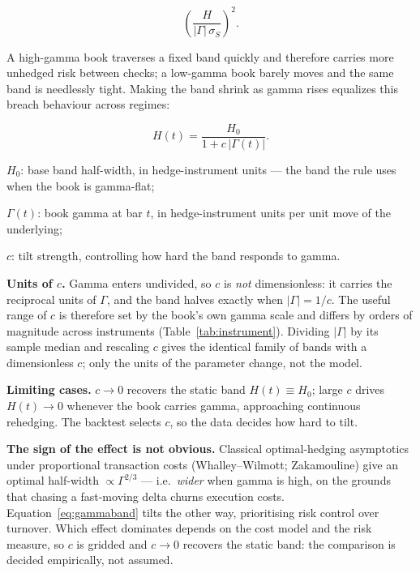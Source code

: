 \documentclass{article}
\begin{document}
\[
\left( \frac{H}{\lvert\Gamma\rvert\,\sigma_S} \right)^{2}.
\]

A high-gamma book traverses a fixed band quickly and therefore carries more unhedged risk
between checks; a low-gamma book barely moves and the same band is needlessly tight.
Making the band shrink as gamma rises equalizes this breach behaviour across regimes:

\begin{eqbox}
\begin{equation}
H(t) = \frac{H_0}{1 + c\,\lvert \Gamma(t) \rvert}.
\label{eq:gammaband}
\end{equation}
\end{eqbox}

\begin{vardefs}
\item $H_0$: base band half-width, in hedge-instrument units --- the band the rule uses
  when the book is gamma-flat;
\item $\Gamma(t)$: book gamma at bar $t$, in hedge-instrument units per unit move of the
  underlying;
\item $c$: tilt strength, controlling how hard the band responds to gamma.
\end{vardefs}

\textbf{Units of $c$.} Gamma enters undivided, so $c$ is \emph{not} dimensionless: it
carries the reciprocal units of $\Gamma$, and the band halves exactly when
$\lvert\Gamma\rvert = 1/c$. The useful range of $c$ is therefore set by the book's own
gamma scale and differs by orders of magnitude across instruments
(Table~\ref{tab:instrument}). Dividing $\lvert\Gamma\rvert$ by its sample median and
rescaling $c$ gives the identical family of bands with a dimensionless $c$; only the
units of the parameter change, not the model.

\textbf{Limiting cases.} $c \to 0$ recovers the static band $H(t) \equiv H_0$; large $c$
drives $H(t) \to 0$ whenever the book carries gamma, approaching continuous rehedging.
The backtest selects $c$, so the data decides how hard to tilt.

\begin{whybox}
\textbf{The sign of the effect is not obvious.} Classical optimal-hedging asymptotics
under proportional transaction costs (Whalley--Wilmott; Zakamouline) give an optimal
half-width $\propto \Gamma^{2/3}$ --- i.e.\ \emph{wider} when gamma is high, on the
grounds that chasing a fast-moving delta churns execution costs. Equation~\eqref{eq:gammaband}
tilts the other way, prioritising risk control over turnover. Which effect dominates
depends on the cost model and the risk measure, so $c$ is gridded and $c \to 0$ recovers
the static band: the comparison is decided empirically, not assumed.
\end{whybox}
\end{document}
